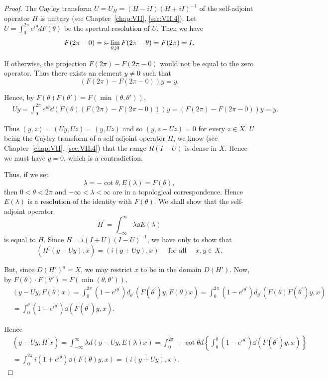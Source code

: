 \begin{proof}
 The Cayley transform $U = U_{H} = (H - iI)(H + iI)^{-1}$ of the self-adjoint operator $H$ is unitary (see Chapter~\ref{chap:VII}, \ref{sec:VII.4}). Let $U = \int_{0}^{2\pi} e^{i\theta} dF(\theta)$ be the spectral resolution of $U$. Then we have 
\[
F (2 \pi - 0) = \text{s-}\lim _{\theta \downarrow 0} F (2 \pi - \theta) = F (2 \pi) = I. \]

If otherwise, the projection $F(2\pi)-F(2\pi-0)$ would not be equal to the zero operator. Thus there exists an element $y \neq 0$ such that 
\[
(F (2 \pi) - F (2 \pi - 0)) y = y.
\]

Hence, by $F(\theta)F(\theta') = F(\min (\theta ,\theta'))$, 
\[
\begin{aligned}
&U y  = \int_{0} ^{2 \pi} e ^{i \theta} \dd (F (\theta) (F (2 \pi) - F (2 \pi - 0))) y = (F (2 \pi) - F (2 \pi - 0)) y = y.
\end{aligned}
\]

Thus $(y, z) = (Uy, Uz) = (y, Uz)$ and so $(y, z - Uz) = 0$ for every $z \in X$. $U$ being the Cayley transform of a self-adjoint operator $H$, we know (see Chapter~\ref{chap:VII}, \ref{sec:VII.4}) that the range $R(I - U)$ is dense in $X$. Hence we must have $y = 0$, which is a contradiction. 

Thus, if we set 
\[
\lambda = - \cot \theta , E (\lambda) = F (\theta),
\]
then $0 < \theta < 2\pi$ and $-\infty < \lambda < \infty$ are in a topological correspondence. Hence $E(\lambda)$ is a resolution of the identity with $F(\theta)$. We shall show that the self-adjoint operator 
\[
H ^{\prime} = \int_{- \infty} ^{\infty} \lambda \dd E (\lambda)
\]
is equal to $H$. Since $H = i(I + U)(I - U)^{-1}$, we have only to show that 
\[
(H ^{\prime} (y - U y), x) = (i (y + U y), x) \quad \text{ for all } \quad x, y \in X.
\]

But, since $D(H')^a = X$, we may restrict $x$ to be in the domain $D(H')$. Now, by $F(\theta) \cdot F(\theta') = F(\min(\theta, \theta'))$, 
\[
\begin{aligned}
&(y - U y, F (\theta) x)  = \int_{0} ^{2 \pi} (1 - e ^ {i \theta^{\prime}}) d _ {\theta^{\prime}} (F (\theta^{\prime}) y, F (\theta) x) = \int_{0} ^{2 \pi} (1 - e ^ {i \theta^{\prime}}) d _ {\theta^{\prime}} (F (\theta) F (\theta^{\prime}) y, x) \\
&= \int_{0} ^{\theta} (1 - e ^ {i \theta^{\prime}}) \dd (F (\theta^{\prime}) y, x).
\end{aligned}
\]

Hence 
\[
\begin{aligned}
&(y - U y, H ^{\prime} x)  = \int_{- \infty} ^{\infty} \lambda d (y - U y, E (\lambda) x) = \int_{0} ^{2 \pi} - \cot \theta d \left\{\int_{0} ^{\theta} (1 - e ^ {i \theta^{\prime}}) \dd (F (\theta^{\prime}) y, x) \right\} \\
&= \int_{0} ^{2 \pi} i (1 + e ^{i \theta}) \dd (F (\theta) y, x) = (i (y + U y), x).
\end{aligned}
\]


\end{proof}
